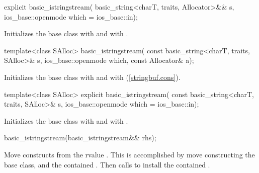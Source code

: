 %
\begin{itemdecl}
explicit basic_istringstream(
  basic_string<charT, traits, Allocator>&& s,
  ios_base::openmode which = ios_base::in);
\end{itemdecl}

\begin{itemdescr}
\pnum
\effects
Initializes the base class with
and  with
.
\end{itemdescr}

%
\begin{itemdecl}
template<class SAlloc>
  basic_istringstream(
    const basic_string<charT, traits, SAlloc>& s,
    ios_base::openmode which, const Allocator& a);
\end{itemdecl}

\begin{itemdescr}
\pnum
\effects
Initializes the base class with
and  with
\linebreak(\ref{stringbuf.cons}). %
\end{itemdescr}

%
\begin{itemdecl}
template<class SAlloc>
  explicit basic_istringstream(
    const basic_string<charT, traits, SAlloc>& s,
    ios_base::openmode which = ios_base::in);
\end{itemdecl}

\begin{itemdescr}
\pnum
\effects
Initializes the base class with
and  with
.
\end{itemdescr}

%
\begin{itemdecl}
basic_istringstream(basic_istringstream&& rhs);
\end{itemdecl}

\begin{itemdescr}
\pnum
\effects
Move constructs from the rvalue . This
is accomplished by move constructing the base class, and the contained
.
Then calls 
to install the contained .
\end{itemdescr}

